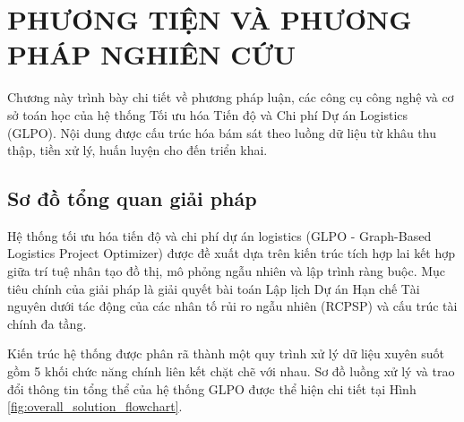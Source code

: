 \chapter{PHƯƠNG TIỆN VÀ PHƯƠNG PHÁP NGHIÊN CỨU}
\label{ch:chuong2_phuong_phap}

Chương này trình bày chi tiết về phương pháp luận, các công cụ công nghệ và cơ sở toán học của hệ thống Tối ưu hóa Tiến độ và Chi phí Dự án Logistics (GLPO). Nội dung được cấu trúc hóa bám sát theo luồng dữ liệu từ khâu thu thập, tiền xử lý, huấn luyện cho đến triển khai.

\section{Sơ đồ tổng quan giải pháp}
\label{sec:2.1_overall_solution}

Hệ thống tối ưu hóa tiến độ và chi phí dự án logistics (GLPO - Graph-Based Logistics Project Optimizer) được đề xuất dựa trên kiến trúc tích hợp lai kết hợp giữa trí tuệ nhân tạo đồ thị, mô phỏng ngẫu nhiên và lập trình ràng buộc. Mục tiêu chính của giải pháp là giải quyết bài toán Lập lịch Dự án Hạn chế Tài nguyên dưới tác động của các nhân tố rủi ro ngẫu nhiên (RCPSP) và cấu trúc tài chính đa tầng.

Kiến trúc hệ thống được phân rã thành một quy trình xử lý dữ liệu xuyên suốt gồm 5 khối chức năng chính liên kết chặt chẽ với nhau. Sơ đồ luồng xử lý và trao đổi thông tin tổng thể của hệ thống GLPO được thể hiện chi tiết tại Hình \ref{fig:overall_solution_flowchart}.

